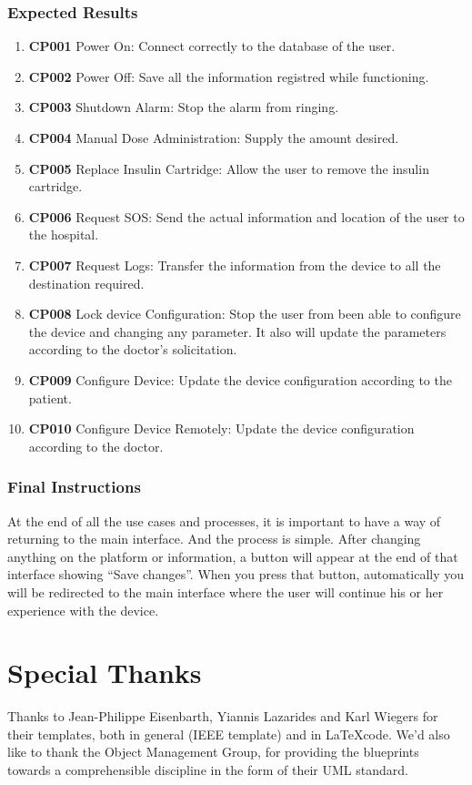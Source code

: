 \documentclass{scrreprt}
\begin{document}
\subsection{Expected Results}
\begin{enumerate}
    \item \textbf{CP001} Power On: Connect correctly to the database of the user.
    \item \textbf{CP002} Power Off: Save all the information registred while functioning.
    \item \textbf{CP003} Shutdown Alarm: Stop the alarm from ringing.
    \item \textbf{CP004} Manual Dose Administration: Supply the amount desired.
    \item \textbf{CP005} Replace Insulin Cartridge: Allow the user to remove the insulin cartridge.
    \item \textbf{CP006} Request SOS: Send the actual information and location of the user to the hospital.
    \item \textbf{CP007} Request Logs: Transfer the information from the device to all the destination required.
    \item \textbf{CP008} Lock device Configuration: Stop the user from been able to configure the device and changing any parameter. It also will update the parameters according to the doctor’s solicitation.
    \item \textbf{CP009} Configure Device: Update the device configuration according to the patient.
    \item \textbf{CP010} Configure Device Remotely: Update the device configuration according to the doctor.
\end{enumerate}
 
\subsection{Final Instructions}
At the end of all the use cases and processes, it is important to have a way of returning to the main interface. And the process is simple. After changing anything on the platform or information, a button will appear at 
the end of that interface showing “Save changes”. When you press that button, automatically you will be redirected to the main interface where the user will continue his or her experience with the device.

\chapter{Special Thanks}
Thanks to Jean-Philippe Eisenbarth, Yiannis Lazarides and Karl Wiegers for their templates, both in general (IEEE template) and in \LaTeX code. We'd also like to thank the Object Management Group, for providing the
blueprints towards a comprehensible discipline in the form of their UML standard.
\end{document}

